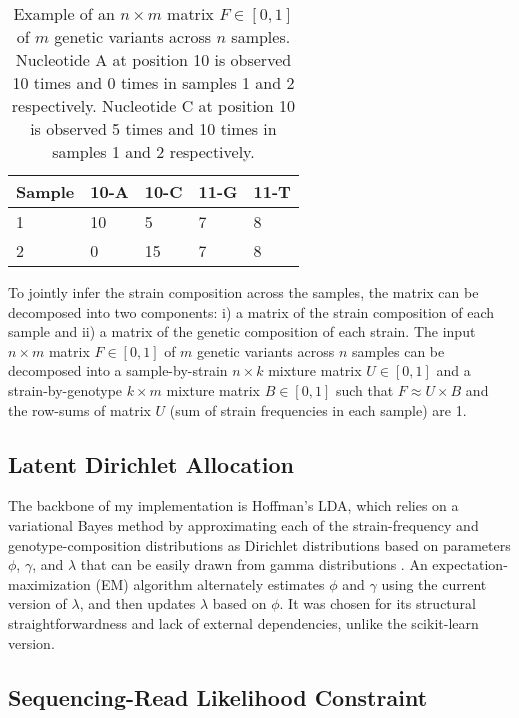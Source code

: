 \documentclass{article}
\begin{document}
\begin{table}[htp]
  \caption{Example of an $n \times m$ matrix $F \in [0,1]$ of $m$ genetic variants across $n$ samples. Nucleotide A at position 10 is observed 10 times and 0 times in samples 1 and 2 respectively. Nucleotide C at position 10 is observed 5 times and 10 times in samples 1 and 2 respectively. } \label{table_1}
  \centering
  \begin{tabular}{|l l l l l|} 
    \toprule
    Sample & 10-A & 10-C & 11-G & 11-T \\ 
    \midrule
    1 & 10 & 5 & 7 & 8 \\ 
    2 & 0 & 15 & 7 & 8 \\ 
    \bottomrule
  \end{tabular}
\end{table}

To jointly infer the strain composition across the samples, the matrix can be decomposed into two components: i) a matrix of the strain composition of each sample and ii) a matrix of the genetic composition of each strain. The input $n \times m$ matrix $F \in [0,1]$ of $m$ genetic variants across $n$ samples can be decomposed into a sample-by-strain $n \times k$ mixture matrix $U \in [0,1]$ and a strain-by-genotype $k \times m$ mixture matrix $B \in [0,1]$ such that $F \approx U \times B$ and the row-sums of matrix $U$ (sum of strain frequencies in each sample) are 1. 
\subsection{Latent Dirichlet Allocation} \label{LDA}

The backbone of my implementation is Hoffman's LDA, which relies on a variational Bayes method by approximating each of the strain-frequency and genotype-composition distributions as Dirichlet distributions based on parameters $\phi$, $\gamma$, and $\lambda$ that can be easily drawn from gamma distributions \cite{Hoffman2010}. An expectation-maximization (EM) algorithm alternately estimates $\phi$ and $\gamma$ using the current version of $\lambda$, and then updates $\lambda$ based on $\phi$. It was chosen for its structural straightforwardness and lack of external dependencies, unlike the scikit-learn version. 


\subsection{Sequencing-Read Likelihood Constraint} \label{Constraint}
\end{document}
